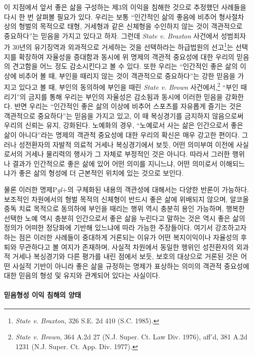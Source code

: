 이 지점에서 앞서 좋은 삶을 구성하는 제3의 이익을 침해한 것으로 추정했던 사례들을 다시 한 번 살펴볼 필요가 있다. 우리는 보통 ``인간적인 삶의 좋음에 비추어 형사절차상의 형벌의 목적으로 태형, 거세형과 같은 신체형을 수인하지 않는 것이 객관적으로 중요하다''는 믿음을 가지고 있다고 하자. 그런데 \emph{State v. Braxton} 사건에서 성범죄자가 30년의 유기징역과 외과적으로 거세하는 것을 선택하라는 하급법원의 선고\footnote{\emph{State v. Braxton}, 326 S.E. 2d 410 (S.C. 1985).}는 선택지를 확장하여 자율성을 증대함과 동시에 위 명제의 객관적 중요성에 대한 우리의 믿음의 견고함을 어느 정도 감소시킨다고 볼 수 있다. 또한 우리는 ``인간적인 좋은 삶의 이상에 비추어 볼 때, 부인을 때리지 않는 것이 객관적으로 중요하다''는 강한 믿음을 가지고 있다고 볼 때, 부인의 동의하에 부인을 때린 \emph{State v. Brown} 사건에서,\footnote{\emph{State v. Brown}, 364 A.2d 27 (N.J. Super. Ct. Law Div. 1976), aff'd, 381 A.2d 1231 (N.J. Super. Ct. App. Div. 1977).} ``부인 때리기''의 금지를 통해 우리는 부인의 자율성은 감소됨과 동시에 이러한 믿음을 강화한다. 반면 우리는 ``인간적인 좋은 삶의 이상에 비추어 스포츠를 자유롭게 즐기는 것은 객관적으로 중요하다''는 믿음을 가지고 있고, 이 때 복싱경기를 금지하지 않음으로써 우리의 신뢰는 유지, 강화된다. 노예화의 경우, ``노예로서 사는 삶은 인간으로서 좋은 삶이 아니다''라는 명제의 객관적 중요성에 대한 우리의 확신은 매우 강고한 편이다. 그러나 성전환자의 자발적 의료적 거세나 복싱경기에서 보듯, 어떤 의미부여 이전에 사실로서의 거세나 물리력의 행사가 그 자체로 부정적인 것은 아니다. 따라서 그러한 행위나 결과가 인간적으로 좋은 삶에 있어 어떤 의미를 지니느냐, 어떤 의미로서 이해되느냐가 좋은 삶의 형성에 더 근본적인 위치에 있는 것으로 보인다.

물론 이러한 명제P\emph{gl}+의 구체화된 내용의 객관성에 대해서는 다양한 반론이 가능하다. 보조적인 차원에서의 형벌 목적의 신체형이 반드시 좋은 삶에 위배되지 않으며, 알코올중독 치료 목적으로 동의하에 부인을 때리는 행위 역시 충분히 용인 가능하며, 행복한 선택한 노예 역시 충분히 인간으로서 좋은 삶을 누린다고 말하는 것은 역시 좋은 삶의 정의가 어떠한 정당화에 기반해 있느냐에 따라 가능한 주장들이다. 여기서 강조하고자 하는 점은 이러한 사례들이 중대하게 거론되는 이유가 어떤 복지이익이나 자율성의 후퇴와 무관하다고 볼 여지가 존재하며, 사실적 차원에서 동일한 행위인 성전환자의 외과적 거세나 복싱경기와 다른 평가를 내린 점에서 보듯, 보호의 대상으로 거론된 것은 어떤 사실적 기반이 아니라 좋은 삶을 규정하는 명제가 표상하는 의미의 객관적 중요성에 대한 믿음의 형성 및 유지와 관계되어 있다는 사실이다.

\paragraph{믿음형성 이익 침해의 양태}


